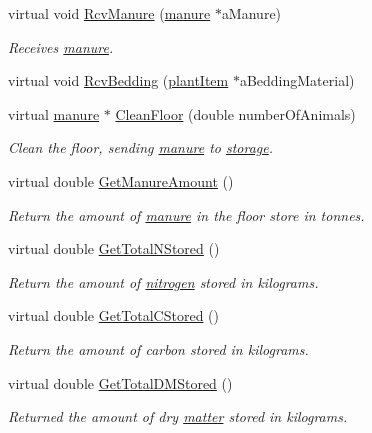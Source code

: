 \begin{DoxyCompactItemize}
virtual void \hyperlink{classfloorstore_a68ddc9791279945f7a42b3c643dd7e1c}{RcvManure} (\hyperlink{classmanure}{manure} $\ast$aManure)
\begin{DoxyCompactList}\small\item\em Receives \hyperlink{classmanure}{manure}. \item\end{DoxyCompactList}\item 
virtual void \hyperlink{classfloorstore_af2c0a2cfbe80ae99b8a25202f2d285b5}{RcvBedding} (\hyperlink{classplant_item}{plantItem} $\ast$aBeddingMaterial)
\item 
virtual \hyperlink{classmanure}{manure} $\ast$ \hyperlink{classfloorstore_ac45898f14f9fe4c06c43bcd95dc30dfd}{CleanFloor} (double numberOfAnimals)
\begin{DoxyCompactList}\small\item\em Clean the floor, sending \hyperlink{classmanure}{manure} to \hyperlink{classstorage}{storage}. \item\end{DoxyCompactList}\item 
virtual double \hyperlink{classfloorstore_aead39ccc3f6e82ecc1f62d1b570c312a}{GetManureAmount} ()
\begin{DoxyCompactList}\small\item\em Return the amount of \hyperlink{classmanure}{manure} in the floor store in tonnes. \item\end{DoxyCompactList}\item 
virtual double \hyperlink{classfloorstore_a62fa4a2efc876c2500010395619fbd5d}{GetTotalNStored} ()
\begin{DoxyCompactList}\small\item\em Return the amount of \hyperlink{classnitrogen}{nitrogen} stored in kilograms. \item\end{DoxyCompactList}\item 
virtual double \hyperlink{classfloorstore_af6c7892c3ec1811e49d62c9875987792}{GetTotalCStored} ()
\begin{DoxyCompactList}\small\item\em Return the amount of carbon stored in kilograms. \item\end{DoxyCompactList}\item 
virtual double \hyperlink{classfloorstore_a70c102d9fd6b4c562075531fea3b520e}{GetTotalDMStored} ()
\begin{DoxyCompactList}\small\item\em Returned the amount of dry \hyperlink{classmatter}{matter} stored in kilograms. \item\end{DoxyCompactList}\item 

\end{DoxyCompactItemize}
